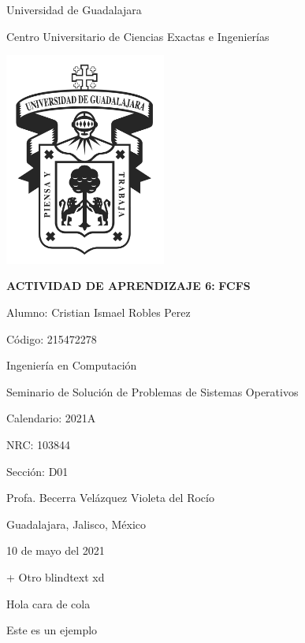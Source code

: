 \documentclass[12pt, oneside]{article}
\title{\tiText}
\newcommand{\code}{215472278}
\newcommand{\calendar}{2021A}
\newcommand{\nrc}{103844}
\newcommand{\signSec}{D01}
\newcommand{\profName}{Profa. Becerra Velázquez Violeta del Rocío}
\newcommand{\actTitle}{FCFS}
\newcommand{\actNum}{ACTIVIDAD DE APRENDIZAJE 6: }
\newcommand{\myName}{Cristian Ismael Robles Perez}
\newcommand{\sign}{Seminario de Solución de Problemas de Sistemas Operativos}
\begin{document}
\begingroup
    \fontsize{18pt}{22pt}\selectfont
    \begin{center}
        Universidad de Guadalajara

        Centro Universitario de Ciencias Exactas e Ingenierías \newline

        \includegraphics[width=200px]{imgs/logo_udg.png} \break

        \textbf{\actNum}
        \textbf{\actTitle} \newline
    \end{center}
\endgroup

\begingroup
    \fontsize{16pt}{18pt}\selectfont
        Alumno: \myName

        Código: \code \newline

        Ingeniería en Computación

        \sign

        Calendario: \calendar

        NRC: \nrc

        Sección: \signSec

        \profName \newline \break

        \begin{flushright}
            Guadalajara, Jalisco, México
            
            10 de mayo del 2021
        \end{flushright}
\endgroup


\newpage

\blindtext
\blindtext
\blindtext
\newpage

\blindtext
\blindtext
\blindtext
\blindtext
\blindtext
\blindtext
\blindtext

\blindtext
\blindtext

\blindtext

\blindtext
+
Otro blindtext xd

\blindtext

Hola cara de cola

\blindtext

Este es un ejemplo

\blindtext
\end{document}
